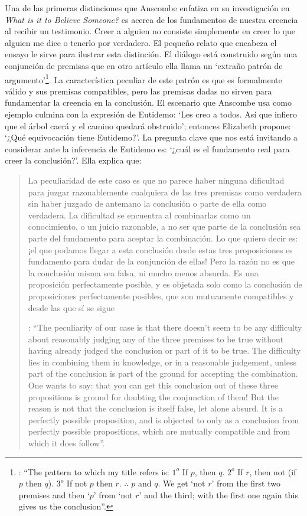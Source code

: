 Una de las primeras distinciones que Anscombe enfatiza en su investigación en \emph{What is it to Believe Someone?} es acerca de los fundamentos de nuestra creencia al recibir un testimonio. Creer a alguien no consiste simplemente en creer lo que alguien me dice o tenerlo por verdadero. El pequeño relato que encabeza el ensayo le sirve para ilustrar esta distinción. El diálogo está construido según una conjunción de premisas que en otro artículo ella llama un `extraño patrón de argumento'\footnote{\cite[Cf.][299]{anscombe2015logic:qpa}: \enquote{The pattern to which my title refers is: $1^{o}$ If $p$, then $q$. $2^{o}$ If $r$, then not (if $p$ then $q$). $3^{o}$ If not $p$ then $r$. $\mathbf{\therefore}$ $p$ and $q$. We get `not $r$' from the first two premises and then `$p$' from `not $r$' and the third; with the first one again this gives us the conclusion}.}. La característica peculiar de este patrón es que es formalmente válido y sus premisas compatibles, pero las premisas dadas no sirven para fundamentar la creencia en la conclusión. El escenario que Anscombe usa como ejemplo culmina con la expresión de Eutidemo: \enquote*{Les creo a todos. Así que infiero que el árbol caerá y el camino quedará obstruido}; entonces Elizabeth propone: \enquote*{¿Qué equivocación tiene Eutidemo?}. La pregunta clave que nos está invitando a considerar ante la inferencia de Eutidemo es: \enquote*{¿cuál es el fundamento real para creer la conclusión?}. Ella explica que: \blockquote[{\Cite[301]{anscombe2015logic:qpa}}: \enquote{The peculiarity of our case is that there doesn't seem to be any difficulty about reasonably judging any of the three premises to be true without having already judged the conclusion or part of it to be true. The difficulty lies in combining them in knowledge, or in a reasonable judgement, unless part of the conclusion is part of the ground for accepting the combination. One wants to say: that you can get this conclusion out of these three propositions is ground for doubting the conjunction of them! But the reason is not that the conclusion is itself false, let alone absurd. It is a perfectly possible proposition, and is objected to only as a conclusion from perfectly possible propositions, which are mutually compatible and from which it does follow}.]{La peculiaridad de este caso es que no parece haber ninguna dificultad para juzgar razonablemente cualquiera de las tres premisas como verdadera sin haber juzgado de antemano la conclusión o parte de ella como verdadera. La dificultad se encuentra al combinarlas como un conocimiento, o un juicio razonable, a no ser que parte de la conclusión sea parte del fundamento para aceptar la combinación. Lo que quiero decir es: ¡el que podamos llegar a esta conclusión desde estas tres proposiciones es fundamento para dudar de la conjunción de ellas! Pero la razón no es que la conclusión misma sea falsa, ni mucho menos absurda. Es una proposición perfectamente posible, y es objetada solo como la conclusión de proposiciones perfectamente posibles, que son mutuamente compatibles y desde las que sí se sigue}.

